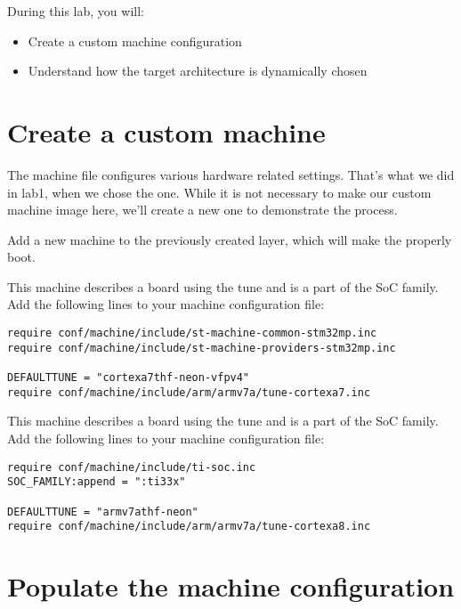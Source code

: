 
During this lab, you will:
\begin{itemize}
  \item Create a custom machine configuration
  \item Understand how the target architecture is dynamically chosen
\end{itemize}

\section{Create a custom machine}

The machine file configures various hardware related settings. That's
what we did in lab1, when we chose the 
{} {} one. While it
is not necessary to make our custom machine image here, we'll create a
new one to demonstrate the process.

Add a new  machine to the previously created layer, which
will make the
 properly
boot.

\if{}
This machine describes a board using the 
tune and is a part of the  SoC family. Add the following
lines to your machine configuration file:

\begin{verbatim}
require conf/machine/include/st-machine-common-stm32mp.inc
require conf/machine/include/st-machine-providers-stm32mp.inc

DEFAULTTUNE = "cortexa7thf-neon-vfpv4"
require conf/machine/include/arm/armv7a/tune-cortexa7.inc
\end{verbatim}
\else
This machine describes a board using the  tune
and is a part of the  SoC family. Add the following lines
to your machine configuration file:

\begin{verbatim}
require conf/machine/include/ti-soc.inc
SOC_FAMILY:append = ":ti33x"

DEFAULTTUNE = "armv7athf-neon"
require conf/machine/include/arm/armv7a/tune-cortexa8.inc
\end{verbatim}
\fi
\section{Populate the machine configuration}

